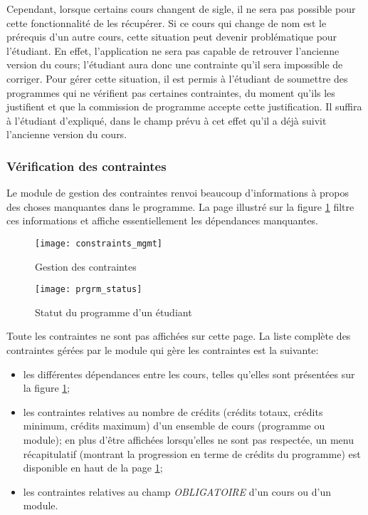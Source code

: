 Cependant, lorsque certains cours changent de sigle, il ne sera pas possible pour cette fonctionnalité de les récupérer. Si ce cours qui change de nom est le prérequis d'un autre cours, cette situation peut devenir problématique pour l'étudiant.  En effet, l'application ne sera pas capable de retrouver l'ancienne version du cours; l'étudiant aura donc une contrainte qu'il sera impossible de corriger.  Pour gérer cette situation, il est permis à l'étudiant de soumettre des programmes qui ne vérifient pas certaines contraintes, du moment qu'ils les justifient et que la commission de programme accepte cette justification. Il suffira à l'étudiant d'expliqué, dans le champ prévu à cet effet qu'il a déjà suivit l'ancienne version du cours.


\subsubsection{Vérification des contraintes}
Le module de gestion des contraintes renvoi beaucoup d'informations à propos des choses manquantes dans le programme. La page illustré sur la figure \ref{fig:constraint_mgmt} filtre ces informations et affiche essentiellement les dépendances manquantes.

\begin{figure}
\centering
\caption{Gestion des contraintes}
\label{fig:constraint_mgmt}
\texttt{[image: constraints\_mgmt]}
\end{figure}

\begin{figure}
\centering
\caption{Statut du programme d'un étudiant}
\label{fig:prgrm_status}
\texttt{[image: prgrm\_status]}
\end{figure} 

Toute les contraintes ne sont pas affichées sur cette page. La liste complète des contraintes gérées par le module qui gère les contraintes est la suivante:
\begin{itemize}
  \item les différentes dépendances entre les cours, telles qu'elles sont présentées sur la figure \ref{fig:constraint_mgmt};
  \item les contraintes relatives au nombre de crédits (crédits totaux, crédits minimum, crédits maximum) d'un ensemble de cours (programme ou module); en plus d'être affichées lorsqu'elles ne sont pas respectée, un menu récapitulatif (montrant la progression en terme de crédits du programme) est disponible en haut de la page \ref{fig:constraint_mgmt};
  \item les contraintes relatives au champ \textit{OBLIGATOIRE} d'un cours ou d'un module.
\end{itemize}


